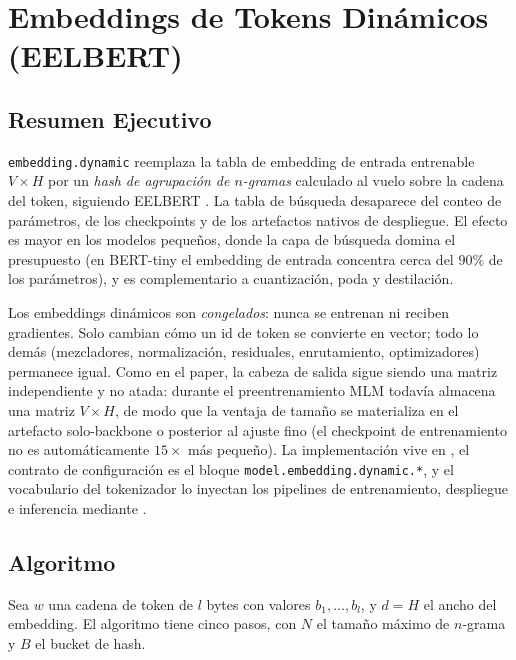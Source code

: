 \section{Embeddings de Tokens Dinámicos (EELBERT)}
\label{sec:annex-embeddings-dinamicos}

\subsection{Resumen Ejecutivo}

\texttt{embedding.dynamic} reemplaza la tabla de embedding de entrada entrenable $V\times H$ por un \emph{hash de agrupación de $n$-gramas} calculado al vuelo sobre la cadena del token, siguiendo EELBERT \citep{cohn_eelbert_2023}. La tabla de búsqueda desaparece del conteo de parámetros, de los checkpoints y de los artefactos nativos de despliegue. El efecto es mayor en los modelos pequeños, donde la capa de búsqueda domina el presupuesto (en BERT-tiny el embedding de entrada concentra cerca del $90\%$ de los parámetros), y es complementario a cuantización, poda y destilación.

Los embeddings dinámicos son \emph{congelados}: nunca se entrenan ni reciben gradientes. Solo cambian cómo un id de token se convierte en vector; todo lo demás (mezcladores, normalización, residuales, enrutamiento, optimizadores) permanece igual. Como en el paper, la cabeza de salida sigue siendo una matriz independiente y no atada: durante el preentrenamiento MLM todavía almacena una matriz $V\times H$, de modo que la ventaja de tamaño se materializa en el artefacto solo-backbone o posterior al ajuste fino (el checkpoint de entrenamiento no es automáticamente $15\times$ más pequeño). La implementación vive en , el contrato de configuración es el bloque \texttt{model.embedding.dynamic.*}, y el vocabulario del tokenizador lo inyectan los pipelines de entrenamiento, despliegue e inferencia mediante .

\subsection{Algoritmo}

Sea $w$ una cadena de token de $l$ bytes con valores $b_1,\dots,b_l$, y $d=H$ el ancho del embedding. El algoritmo tiene cinco pasos, con $N$ el tamaño máximo de $n$-grama y $B$ el bucket de hash.

